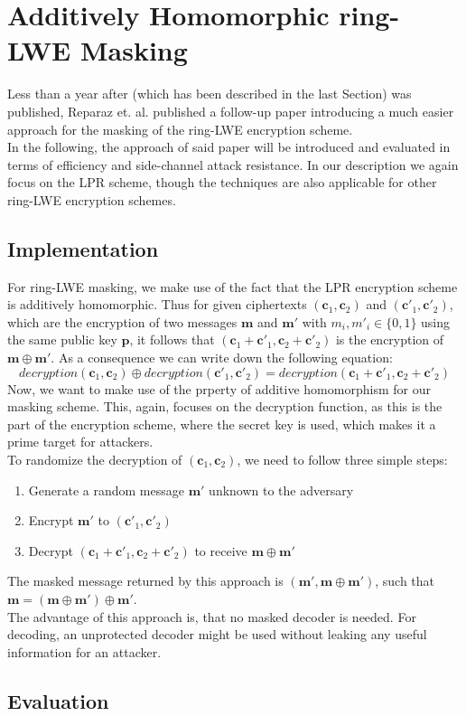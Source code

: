%
%

\chapter{Additively Homomorphic ring-LWE Masking}
Less than a year after \cite{maskedRing} (which has been described in the last Section) was published, Reparaz et. al. published a follow-up paper \cite{Reparaz2016} introducing a much easier approach for the masking of the \ac{ring-LWE} encryption scheme.\\
In the following, the approach of said paper will be introduced and evaluated in terms of efficiency and side-channel attack resistance. In our description we again focus on the \ac{LPR} scheme, though the techniques are also applicable for other \ac{ring-LWE} encryption schemes.

\section{Implementation}
For \ac{ring-LWE} masking, we make use of the fact that the \ac{LPR} encryption scheme is additively homomorphic. Thus for given ciphertexts \((\textbf{c}_1, \textbf{c}_2)\) and \((\textbf{c}'_1, \textbf{c}'_2)\), which are the encryption of two messages \(\textbf{m}\) and \(\textbf{m}'\) with \(m_i, m'_i \in \{0,1\}\) using the same public key \(\textbf{p}\), it follows that \((\textbf{c}_1+\textbf{c}'_1, \textbf{c}_2+\textbf{c}'_2)\) is the encryption of \(\textbf{m} \oplus \textbf{m}'\). As a consequence we can write down the following equation:
\begin{equation}
	decryption(\textbf{c}_1,\textbf{c}_2) \oplus decryption(\textbf{c}'_1,\textbf{c}'_2) = decryption(\textbf{c}_1 + \textbf{c}'_1,\textbf{c}_2 + \textbf{c}'_2)
\end{equation}
Now, we want to make use of the prperty of additive homomorphism for our masking scheme. This, again, focuses on the decryption function, as this is the part of the encryption scheme, where the secret key is used, which makes it a prime target for attackers.\\
To randomize the decryption of \((\textbf{c}_1, \textbf{c}_2)\), we need to follow three simple steps:
\begin{enumerate}
\item Generate a random message \(\textbf{m}'\) unknown to the adversary
\item Encrypt \(\textbf{m}'\) to \((\textbf{c}'_1, \textbf{c}'_2)\)
\item Decrypt \((\textbf{c}_1+\textbf{c}'_1, \textbf{c}_2+\textbf{c}'_2)\) to receive \(\textbf{m} \oplus \textbf{m}'\)
\end{enumerate}
The masked message returned by this approach is \((\textbf{m}', \textbf{m} \oplus \textbf{m}')\), such that \(\textbf{m} = (\textbf{m} \oplus \textbf{m}') \oplus \textbf{m}'\).\\
The advantage of this approach is, that no masked decoder is needed. For decoding, an unprotected decoder might be used without leaking any useful information for an attacker.

\section{Evaluation}